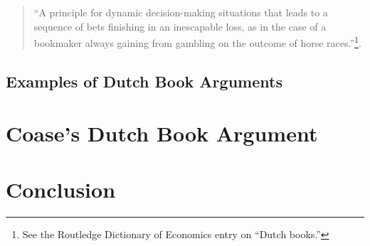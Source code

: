 \documentclass[11pt,]{article}
\begin{document}
\begin{quote}
``A principle for dynamic decision-making situations that leads to a
sequence of bets finishing in an inescapable loss, as in the case of a
bookmaker always gaining from gambling on the outcome of horse
races.''\footnote{See the Routledge Dictionary of Economics entry on
  ``Dutch books.''}.
\end{quote}

\subsection{Examples of Dutch Book
Arguments}\label{examples-of-dutch-book-arguments}

\section{Coase's Dutch Book Argument}\label{coases-dutch-book-argument}

\section{Conclusion}\label{conclusion}

\newpage
\singlespacing 

\end{document}
